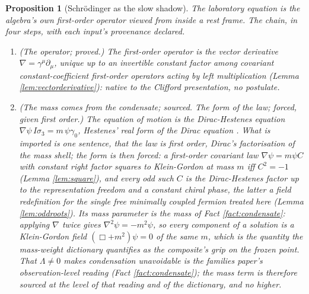 \documentclass[11pt]{article}
\newtheorem{proposition}[theorem]{Proposition}
\theoremstyle{definition}
\begin{document}
\begin{proposition}[Schr\"odinger as the slow shadow]\label{prop:slowshadow}
The laboratory equation is the algebra's own first-order operator viewed from inside a rest frame. The chain, in four steps, with each input's provenance declared.
\begin{enumerate}
\item \emph{(The operator; proved.)} The first-order operator is the vector derivative $\nabla = \gamma^{\mu}\partial_{\mu}$, unique up to an invertible constant factor among covariant constant-coefficient first-order operators acting by left multiplication (Lemma \ref{lem:vectorderivative}): native to the Clifford presentation, no postulate.
\item \emph{(The mass comes from the condensate; sourced. The form of the law; forced, given first order.)} The equation of motion is the Dirac-Hestenes equation $\nabla\psi\, I\sigma_{3} = m\,\psi\gamma_{0}$, Hestenes' real form of the Dirac equation \cite{Hestenes1967, Hestenes1975}. What is imported is one sentence, that the law is first order, Dirac's factorisation of the mass shell; the form is then forced: a first-order covariant law $\nabla\psi = m\psi C$ with constant right factor squares to Klein-Gordon at mass $m$ iff $C^{2} = -1$ (Lemma \ref{lem:square}), and every odd such $C$ is the Dirac-Hestenes factor up to the representation freedom and a constant chiral phase, the latter a field redefinition for the single free minimally coupled fermion treated here (Lemma \ref{lem:oddroots}). Its mass parameter is the mass of Fact \ref{fact:condensate}: applying $\nabla$ twice gives $\nabla^{2}\psi = -m^{2}\psi$, so every component of a solution is a Klein-Gordon field $(\Box + m^{2})\psi = 0$ of the same $m$, which is the quantity the mass-weight dictionary quantifies as the composite's grip on the frozen point. That $\Lambda \neq 0$ makes condensation unavoidable is the families paper's observation-level reading (Fact \ref{fact:condensate}); the mass term is therefore sourced at the level of that reading and of the dictionary, and no higher.

\end{enumerate}
\end{proposition}
\end{document}
